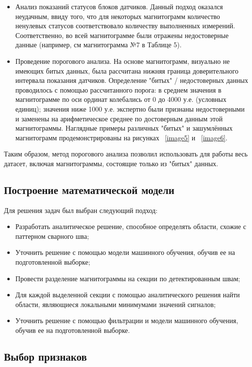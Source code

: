 \documentclass[a4paper,article,14pt]{extarticle}
\begin{document}
\begin{itemize}
    \item Анализ показаний статусов блоков датчиков. Данный подход оказался неудачным, ввиду того, что для некоторых магнитограмм количество ненулевых статусов соответствовало количеству выполненных измерений. Соответственно, во всей магнитограмме были отражены недостоверные данные (например, см магнитограмма №7 в Таблице 5).
    \item Проведение порогового анализа. На основе магнитограмм, визуально не имеющих битых данных, была рассчитана нижняя граница доверительного интервала показания датчиков. Определение "битых" / недостоверных данных проводилось с помощью рассчитанного порога: в среднем значения в магнитограмме по оси ординат колебались от 0 до 4000 у.е. (условных единиц); значения ниже 1000 у.е. экспертно были признаны недостоверными и заменены на арифметическое среднее по достоверным данным этой магнитограммы. Наглядные примеры различных "битых" и зашумлённых магнитограмм продемонстрированы на рисунках ~\ref{image5} и ~\ref{image6}.
\end{itemize}

Таким образом, метод порогового анализа позволил использовать для работы весь датасет, 
включая магнитограммы, состоящие только из "битых" данных. 

\subsection{Построение математической модели}

Для решения задач был выбран следующий подход:
\begin{itemize}
    \item Разработать аналитическое решение, способное определять области, схожие с паттерном сварного шва;
    \item Уточнить решение с помощью модели машинного обучения, обучив ее на подготовленной выборке;
    \item Провести разделение магнитограммы на секции по детектированным швам;
    \item Для каждой выделенной секции с помощью аналитического решения найти области, являющиеся локальными минимумами значений сигналов;
    \item Уточнить решение с помощью фильтрации и модели машинного обучения, обучив ее на подготовленной выборке.
\end{itemize}

\subsection{Выбор признаков}
\end{document}
